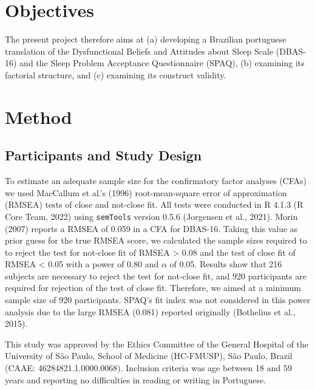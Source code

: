 \documentclass[
  ,doc,11pt, twoside,floatsintext]{apa6}
\begin{document}
\hypertarget{objectives}{%
\section{Objectives}\label{objectives}}

The present project therefore aims at (a) developing a Brazilian portuguese translation of the Dysfunctional Beliefs and Attitudes about Sleep Scale (DBAS-16) and the Sleep Problem Acceptance Questionnaire (SPAQ), (b) examining its factorial structure, and (c) examining its construct validity.

\newpage

\hypertarget{method}{%
\section{Method}\label{method}}

\hypertarget{participants-and-study-design}{%
\subsection{Participants and Study Design}\label{participants-and-study-design}}

To estimate an adequate sample size for the confirmatory factor analyses (CFAs) we used MacCallum et al.'s (1996) root-mean-square error of approximation (RMSEA) tests of close and not-close fit. All tests were conducted in R 4.1.3 (R Core Team, 2022) using \texttt{semTools} version 0.5.6 (Jorgensen et al., 2021). Morin (2007) reports a RMSEA of 0.059 in a CFA for DBAS-16. Taking this value as prior guess for the true RMSEA score, we calculated the sample sizes required to to reject the test for not-close fit of RMSEA \textgreater{} 0.08 and the test of close fit of RMSEA \textless{} 0.05 with a power of 0.80 and \(\alpha\) of 0.05. Results show that 216 subjects are necessary to reject the test for not-close fit, and 920 participants are required for rejection of the test of close fit. Therefore, we aimed at a minimum sample size of 920 participants. SPAQ's fit index was not considered in this power analysis due to the large RMSEA (0.081) reported originally (Bothelius et al., 2015).

This study was approved by the Ethics Committee of the General Hospital of the University of São Paulo, School of Medicine (HC-FMUSP), São Paulo, Brazil (CAAE: 46284821.1.0000.0068). Inclusion criteria was age between 18 and 59 years and reporting no difficulties in reading or writing in Portuguese.
\end{document}
